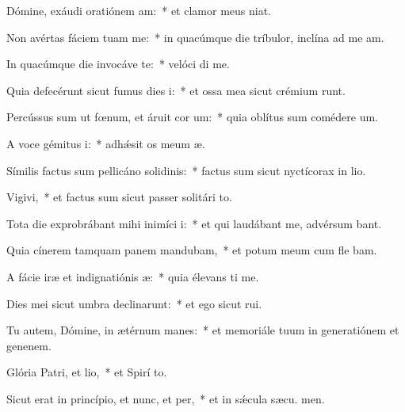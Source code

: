 \item Dómine, exáudi oratiónem am:~* et clamor meus   niat.
\item Non avértas fáciem tuam  me:~* in quacúmque die tríbulor, inclína ad me  am.
\item In quacúmque die invocáve te:~* velóci di me.
\item Quia defecérunt sicut fumus dies i:~* et ossa mea sicut crémium runt.
\item Percússus sum ut fœnum, et áruit cor um:~* quia oblítus sum comédere  um.
\item A voce gémitus i:~* adhǽsit os meum  æ.
\item Símilis factus sum pellicáno solidinis:~* factus sum sicut nyctícorax in lio.
\item Vigivi,~* et factus sum sicut passer solitári  to.
\item Tota die exprobrábant mihi inimíci i:~* et qui laudábant me, advérsum  bant.
\item Quia cínerem tamquam panem mandubam,~* et potum meum cum fle bam.
\item A fácie iræ et indignatiónis æ:~* quia élevans ti me.
\item Dies mei sicut umbra declinarunt:~* et ego sicut  rui.
\item Tu autem, Dómine, in ætérnum manes:~* et memoriále tuum in generatiónem et genenem.
\item Glória Patri, et lio,~* et Spirí to.
\item Sicut erat in princípio, et nunc, et per,~* et in sǽcula sæcu. men.
